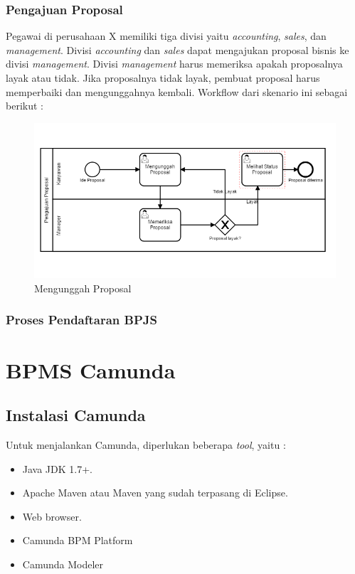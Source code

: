 \subsubsection{Pengajuan Proposal}
Pegawai di perusahaan X memiliki tiga divisi yaitu \textit{accounting}, \textit{sales}, dan \textit{management}. Divisi \textit{accounting} dan \textit{sales} dapat mengajukan proposal bisnis ke divisi \textit{management}. Divisi \textit{management} harus memeriksa apakah proposalnya layak atau tidak. Jika proposalnya tidak layak, pembuat proposal harus memperbaiki dan mengunggahnya kembali. Workflow dari skenario ini sebagai berikut :

		\begin{figure}[H]
			\centering
			\includegraphics[scale=0.5]{Gambar/Bab-3/Kasus2-3}
			\caption{Mengunggah Proposal} 
			\label{fig:mengunggahproposalgroup}
		\end{figure}

\subsubsection{Proses Pendaftaran BPJS}



\section{BPMS Camunda}
\subsection{Instalasi Camunda}
\label{instalasicamunda}
Untuk menjalankan Camunda, diperlukan beberapa \textit{tool}\cite{bpmngetstarted:15:camunda}, yaitu :
\begin{itemize}
	\item Java JDK 1.7+.
	\item Apache Maven atau Maven yang sudah terpasang di Eclipse.
	\item Web browser.
	\item Camunda BPM Platform 
	\item Camunda Modeler
\end{itemize}


